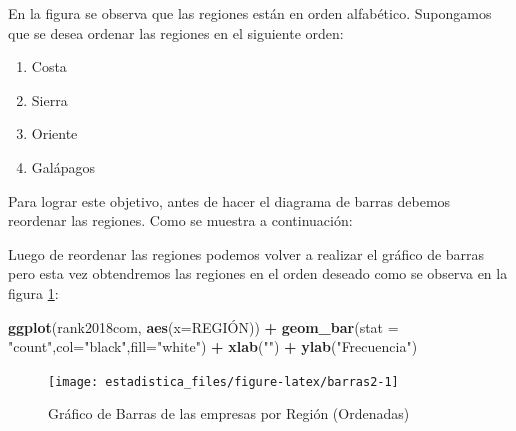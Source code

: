 \documentclass[]{book}
\newenvironment{Shaded}{\begin{snugshade}}{\end{snugshade}}
\newcommand{\DataTypeTok}[1]{\textcolor[rgb]{0.13,0.29,0.53}{#1}}
\newcommand{\KeywordTok}[1]{\textcolor[rgb]{0.13,0.29,0.53}{\textbf{#1}}}
\newcommand{\NormalTok}[1]{#1}
\newcommand{\OperatorTok}[1]{\textcolor[rgb]{0.81,0.36,0.00}{\textbf{#1}}}
\newcommand{\StringTok}[1]{\textcolor[rgb]{0.31,0.60,0.02}{#1}}
\providecommand{\tightlist}{%
  \setlength{\itemsep}{0pt}\setlength{\parskip}{0pt}}
\begin{document}
En la figura se observa que las regiones están en orden alfabético. Supongamos que se desea ordenar las regiones en el siguiente orden:

\begin{enumerate}
\def\labelenumi{\arabic{enumi}.}
\tightlist
\item
  Costa
\item
  Sierra
\item
  Oriente
\item
  Galápagos
\end{enumerate}

Para lograr este objetivo, antes de hacer el diagrama de barras debemos reordenar las regiones. Como se muestra a continuación:

\begin{Shaded}
\end{Shaded}

Luego de reordenar las regiones podemos volver a realizar el gráfico de barras pero esta vez obtendremos las regiones en el orden deseado como se observa en la figura \ref{fig:barras2}:

\begin{Shaded}
\begin{Highlighting}[]
\KeywordTok{ggplot}\NormalTok{(rank2018com, }\KeywordTok{aes}\NormalTok{(}\DataTypeTok{x=}\NormalTok{REGIÓN)) }\OperatorTok{+}\StringTok{ }
\StringTok{  }\KeywordTok{geom_bar}\NormalTok{(}\DataTypeTok{stat =} \StringTok{"count"}\NormalTok{,}\DataTypeTok{col=}\StringTok{"black"}\NormalTok{,}\DataTypeTok{fill=}\StringTok{"white"}\NormalTok{) }\OperatorTok{+}
\StringTok{  }\KeywordTok{xlab}\NormalTok{(}\StringTok{""}\NormalTok{) }\OperatorTok{+}\StringTok{ }\KeywordTok{ylab}\NormalTok{(}\StringTok{"Frecuencia"}\NormalTok{)}
\end{Highlighting}
\end{Shaded}

\begin{figure}[h!]

{\centering \texttt{[image: estadistica\_files/figure-latex/barras2-1]} 

}

\caption{Gráfico de Barras de las empresas por Región (Ordenadas)}\label{fig:barras2}
\end{figure}
\end{document}
